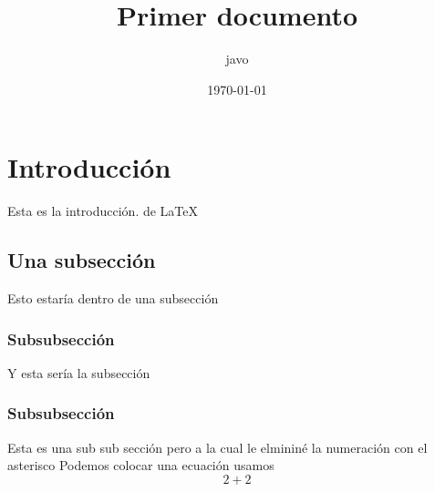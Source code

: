 \documentclass[12pt,letterpaper]{article} %
\author{javo}
\title{Primer documento}
\date{\today}
\begin{document}

\maketitle
	
\section{Introducción}
Esta es la introducción. de \LaTeX\
\subsection{Una subsección}
Esto estaría dentro de una subsección
\subsubsection{Subsubsección}
Y esta sería la subsección
\subsubsection*{Subsubsección}
Esta es una sub sub sección pero a la cual le elmininé la numeración con el asterisco
Podemos colocar una ecuación usamos 
\begin{equation}
2+2
\end{equation}
\end{document}

